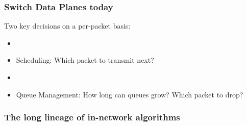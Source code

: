 \begin{Large}
\begin{frame}[plain]
\frametitle{Switch Data Planes today}
Two key decisions on a per-packet basis:
\begin{itemize}
\item[]
\item Scheduling: Which packet to transmit next?
\item[]
\item Queue Management: How long can queues grow? Which packet to drop?
\end{itemize}
\end{frame}

\begin{frame}[plain]
\frametitle{The long lineage of in-network algorithms}

\end{frame}
\end{Large}
